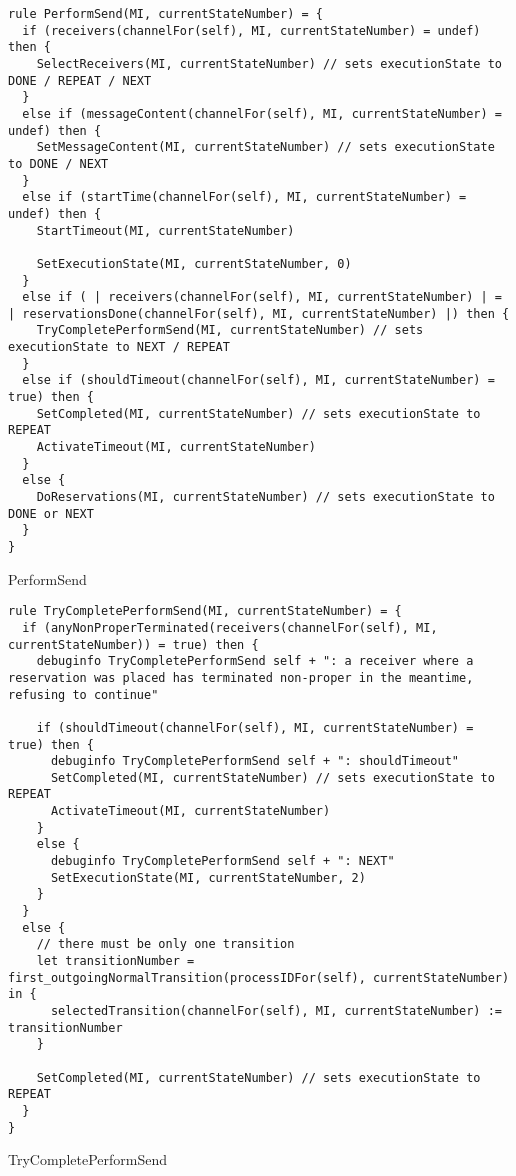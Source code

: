 \begin{listing}[H]
\begin{verbatim}
rule PerformSend(MI, currentStateNumber) = {
  if (receivers(channelFor(self), MI, currentStateNumber) = undef) then {
    SelectReceivers(MI, currentStateNumber) // sets executionState to DONE / REPEAT / NEXT
  }
  else if (messageContent(channelFor(self), MI, currentStateNumber) = undef) then {
    SetMessageContent(MI, currentStateNumber) // sets executionState to DONE / NEXT
  }
  else if (startTime(channelFor(self), MI, currentStateNumber) = undef) then {
    StartTimeout(MI, currentStateNumber)

    SetExecutionState(MI, currentStateNumber, 0)
  }
  else if ( | receivers(channelFor(self), MI, currentStateNumber) | = | reservationsDone(channelFor(self), MI, currentStateNumber) |) then {
    TryCompletePerformSend(MI, currentStateNumber) // sets executionState to NEXT / REPEAT
  }
  else if (shouldTimeout(channelFor(self), MI, currentStateNumber) = true) then {
    SetCompleted(MI, currentStateNumber) // sets executionState to REPEAT
    ActivateTimeout(MI, currentStateNumber)
  }
  else {
    DoReservations(MI, currentStateNumber) // sets executionState to DONE or NEXT
  }
}
\end{verbatim}
\caption{PerformSend}
\label{lst:asm:PerformSend}
\end{listing}




\begin{listing}[H]
\begin{verbatim}
rule TryCompletePerformSend(MI, currentStateNumber) = {
  if (anyNonProperTerminated(receivers(channelFor(self), MI, currentStateNumber)) = true) then {
    debuginfo TryCompletePerformSend self + ": a receiver where a reservation was placed has terminated non-proper in the meantime, refusing to continue"

    if (shouldTimeout(channelFor(self), MI, currentStateNumber) = true) then {
      debuginfo TryCompletePerformSend self + ": shouldTimeout"
      SetCompleted(MI, currentStateNumber) // sets executionState to REPEAT
      ActivateTimeout(MI, currentStateNumber)
    }
    else {
      debuginfo TryCompletePerformSend self + ": NEXT"
      SetExecutionState(MI, currentStateNumber, 2)
    }
  }
  else {
    // there must be only one transition
    let transitionNumber = first_outgoingNormalTransition(processIDFor(self), currentStateNumber) in {
      selectedTransition(channelFor(self), MI, currentStateNumber) := transitionNumber
    }

    SetCompleted(MI, currentStateNumber) // sets executionState to REPEAT
  }
}
\end{verbatim}
\caption{TryCompletePerformSend}
\label{lst:asm:TryCompletePerformSend}
\end{listing}





